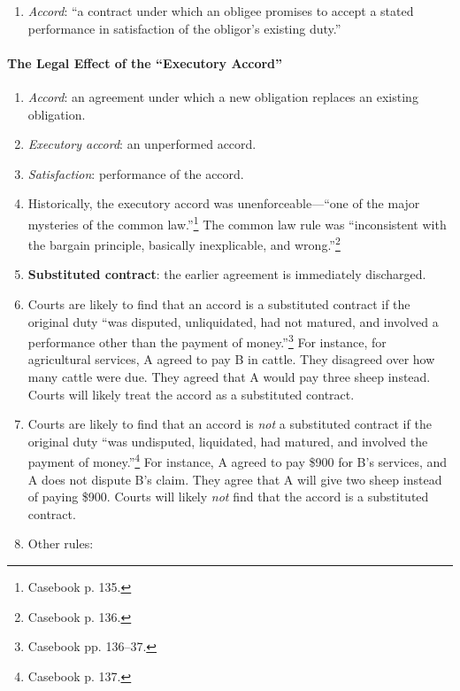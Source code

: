 \begin{enumerate}
    \item \emph{Accord}: ``a contract under which an obligee promises to 
    accept a stated performance in satisfaction of the obligor's existing 
    duty.''
\end{enumerate}

\paragraph{The Legal Effect of the ``Executory Accord''}

\begin{enumerate}
    \item \emph{Accord}: an agreement under which a new obligation replaces an 
    existing obligation.
    \item \emph{Executory accord}: an unperformed accord.
    \item \emph{Satisfaction}: performance of the accord.
    \item Historically, the executory accord was unenforceable---``one of the 
    major mysteries of the common law.''\footnote{Casebook p. 135.} The common 
    law rule was ``inconsistent with the bargain principle, basically 
    inexplicable, and wrong.''\footnote{Casebook p. 136.}
    \item \textbf{Substituted contract}: the earlier agreement is immediately 
    discharged.
    \item Courts are likely to find that an accord is a substituted contract 
    if the original duty ``was disputed, unliquidated, had not matured, and 
    involved a performance other than the payment of 
    money.''\footnote{Casebook pp. 136--37.} For instance, for agricultural 
    services, A agreed to pay B in cattle. They disagreed over how many cattle 
    were due. They agreed that A would pay three sheep instead. Courts will 
    likely treat the accord as a substituted contract.
    \item Courts are likely to find that an accord is \emph{not} a substituted 
    contract if the original duty ``was undisputed, liquidated, had matured, 
    and involved the payment of money.''\footnote{Casebook p. 137.} For 
    instance, A agreed to pay \$900 for B's services, and A does not dispute 
    B's claim. They agree that A will give two sheep instead of paying \$900. 
    Courts will likely \emph{not} find that the accord is a substituted 
    contract.
    \item Other rules:
    \begin{enumerate}

\end{enumerate}
\end{enumerate}
